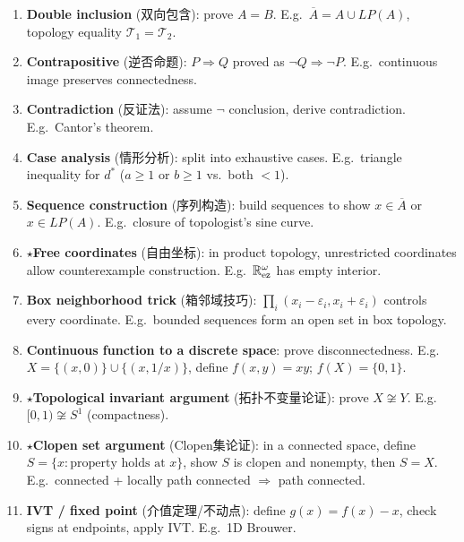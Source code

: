 \documentclass{article}
\newcommand{\starKey}{\textcolor{red!65!black}{\textbf{$\star$}}}
\begin{document}
\begin{enumerate}
  \item \textbf{Double inclusion} (双向包含): prove $A=B$.
  E.g.\ $\overline{A}=A\cup LP(A)$, topology equality $\mathcal{T}_1=\mathcal{T}_2$.

  \item \textbf{Contrapositive} (逆否命题): $P\Rightarrow Q$ proved as $\neg Q\Rightarrow\neg P$.
  E.g.\ continuous image preserves connectedness.

  \item \textbf{Contradiction} (反证法): assume $\neg$ conclusion, derive contradiction.
  E.g.\ Cantor's theorem.

  \item \textbf{Case analysis} (情形分析): split into exhaustive cases.
  E.g.\ triangle inequality for $d^*$ ($a\ge1$ or $b\ge1$ vs.\ both $<1$).

  \item \textbf{Sequence construction} (序列构造): build sequences to show
  $x\in\overline{A}$ or $x\in LP(A)$. E.g.\ closure of topologist's sine curve.

  \item \starKey \textbf{Free coordinates} (自由坐标): in product topology, unrestricted
  coordinates allow counterexample construction.
  E.g.\ $\mathbb{R}^\omega_{\mathrm{ez}}$ has empty interior.

  \item \textbf{Box neighborhood trick} (箱邻域技巧):
  $\prod_i(x_i-\varepsilon_i,x_i+\varepsilon_i)$ controls every coordinate.
  E.g.\ bounded sequences form an open set in box topology.

  \item \textbf{Continuous function to a discrete space}: prove disconnectedness.
  E.g.\ $X=\{(x,0)\}\cup\{(x,1/x)\}$, define $f(x,y)=xy$; $f(X)=\{0,1\}$.

  \item \starKey \textbf{Topological invariant argument} (拓扑不变量论证):
  prove $X\not\cong Y$. E.g.\ $[0,1)\not\cong S^1$ (compactness).

  \item \starKey \textbf{Clopen set argument} (Clopen集论证): in a connected space,
  define $S=\{x:\text{property holds at }x\}$, show $S$ is clopen and nonempty,
  then $S=X$. E.g.\ connected + locally path connected $\Rightarrow$ path connected.

  \item \textbf{IVT / fixed point} (介值定理/不动点): define $g(x)=f(x)-x$,
  check signs at endpoints, apply IVT. E.g.\ 1D Brouwer.


\end{enumerate}
\end{document}
